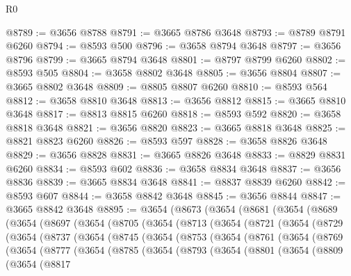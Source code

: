 \begin{lexlean}{R0}
\begin{coremodule}
@8789 := @3656 @8788
@8791 := @3665 @8786 @3648
@8793 := @8789 @8791 @6260
@8794 := @8593 @500
@8796 := @3658 @8794 @3648
@8797 := @3656 @8796
@8799 := @3665 @8794 @3648
@8801 := @8797 @8799 @6260
@8802 := @8593 @505
@8804 := @3658 @8802 @3648
@8805 := @3656 @8804
@8807 := @3665 @8802 @3648
@8809 := @8805 @8807 @6260
@8810 := @8593 @564
@8812 := @3658 @8810 @3648
@8813 := @3656 @8812
@8815 := @3665 @8810 @3648
@8817 := @8813 @8815 @6260
@8818 := @8593 @592
@8820 := @3658 @8818 @3648
@8821 := @3656 @8820
@8823 := @3665 @8818 @3648
@8825 := @8821 @8823 @6260
@8826 := @8593 @597
@8828 := @3658 @8826 @3648
@8829 := @3656 @8828
@8831 := @3665 @8826 @3648
@8833 := @8829 @8831 @6260
@8834 := @8593 @602
@8836 := @3658 @8834 @3648
@8837 := @3656 @8836
@8839 := @3665 @8834 @3648
@8841 := @8837 @8839 @6260
@8842 := @8593 @607
@8844 := @3658 @8842 @3648
@8845 := @3656 @8844
@8847 := @3665 @8842 @3648
@8895 := @3654
    (@8673
      (@3654
        (@8681
          (@3654
            (@8689
              (@3654
                (@8697
                  (@3654
                    (@8705
                      (@3654
                        (@8713
                          (@3654
                            (@8721
                              (@3654
                                (@8729
                                  (@3654
                                    (@8737
                                      (@3654
                                        (@8745
                                          (@3654
                                            (@8753
                                              (@3654
                                                (@8761
                                                  (@3654
                                                    (@8769
                                                      (@3654
                                                        (@8777
                                                          (@3654
                                                            (@8785
                                                              (@3654
                                                                (@8793
                                                                  (@3654
                                                                    (@8801
                                                                      (@3654
                                                                        (@8809
                                                                          (@3654
                                                                            (@8817

\end{coremodule}
\end{lexlean}

